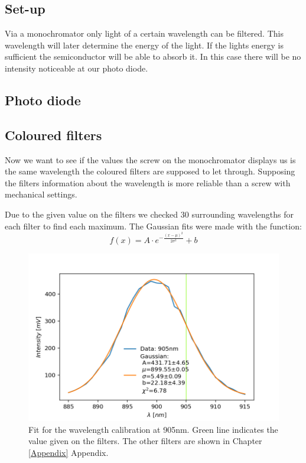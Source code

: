 \documentclass[]{article}
\begin{document}
\subsection{Set-up}

Via a monochromator only light of a certain wavelength can be filtered. This wavelength will later determine the energy of the light. If the lights energy is sufficient the semiconductor will be able to absorb it. In this case there will be no intensity noticeable at our photo diode. 



\subsection{Photo diode}
\subsection{Coloured filters} \label{color filters}
Now we want to see if the values the screw on the monochromator displays us is the same wavelength the coloured filters are supposed to let through. Supposing the filters information about the wavelength is more reliable than a screw with mechanical settings.

Due to the given value on the filters we checked 30 surrounding wavelengths for each filter to find each maximum. The Gaussian fits were made with the function:
\begin{equation}
f(x) = A \cdot e^{-\frac{(x-\mu)^2}{2 \sigma^2}} + b
\end{equation}

\begin{figure}[H]
\centering
\includegraphics[width=.9\textwidth]{Plots/905nm-Filter.png}
\caption{Fit for the wavelength calibration at 905nm. Green line indicates the value given on the filters. The other filters are shown in Chapter \ref{Appendix} Appendix.}
\end{figure}
\end{document}
